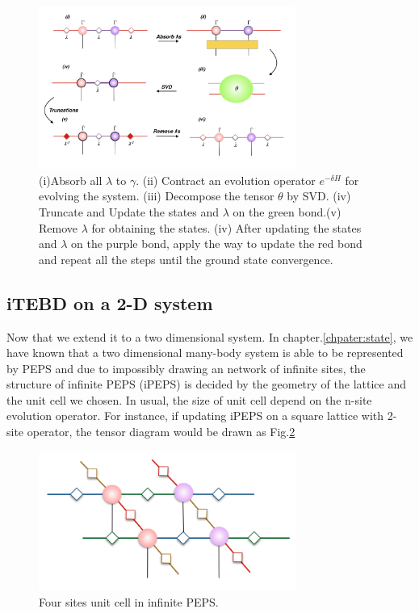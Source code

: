 \label{1ditebd}
\begin{figure}[ht]
	\centering
	\includegraphics[width=0.75\textwidth]{figures/fig313.png}
	\caption[The tensor network diagrams for the 1-D iTEBD]{ (i)Absorb all $\lambda$ to $\gamma$. (ii) Contract an evolution operator $e^{-\delta H}$ for evolving the system. (iii) Decompose the tensor $\theta$ by SVD. (iv) Truncate and Update the states and $\lambda$ on the green bond.(v) Remove $
		\lambda$ for obtaining the states. (iv) After updating the states and $\lambda$ on the purple bond, apply the way to update the red bond and repeat all the steps until the ground state convergence.}
	\label{fig313}
\end{figure}

\subsection{iTEBD on a 2-D system}
\label{2ditebd}

Now that we extend it to a two dimensional system. In chapter.\ref{chpater:state}, we have known that a two dimensional many-body system is able to be represented by PEPS and due to impossibly drawing an network of infinite sites, the structure of infinite PEPS (iPEPS) is decided by the geometry of the lattice and the unit cell we chosen. In usual, the size of unit cell depend on the n-site evolution operator. For instance, if updating iPEPS on a square lattice with 2-site operator, the tensor diagram would be drawn as Fig.\ref{fig314} 

	\begin{figure}[ht]
	\centering
	\includegraphics[width=0.75\textwidth]{figures/fig314.png}
	\caption[The tensor diagrams of 2-D lattice]{Four sites unit cell in infinite PEPS.}
	\label{fig314}
	\end{figure}

